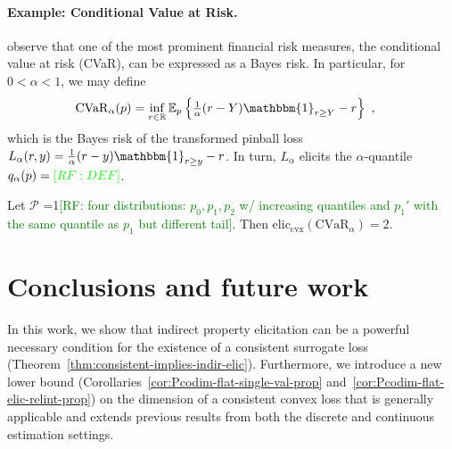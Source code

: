 \documentclass[anon,12pt]{colt2021} %
\newcommand{\Comments}{1}
\newcommand{\mynote}[2]{\ifnum\Comments=1\textcolor{#1}{#2}\fi}
\newcommand{\raf}[1]{\mynote{green}{[RF: #1]}}
\newcommand{\reals}{\mathbb{R}}
\newcommand{\eliccvx}{\mathrm{elic}_\mathrm{cvx}}
\newcommand{\E}{\mathbb{E}}
\renewcommand{\P}{\mathcal{P}}
\newcommand{\CVaR}{\mathrm{CVaR}}
\newcommand{\ones}{\mathbbm{1}}
\begin{document}
\paragraph{Example: Conditional Value at Risk.}

\citet{frongillo2018elicitation} observe that one of the most prominent financial risk measures, the conditional value at risk (CVaR), can be expressed as a Bayes risk.
In particular, for $0 < \alpha < 1$, we may define
\begin{align}
  \CVaR_\alpha(p)
  &= \inf_{r\in\reals} \E_p\left\{ \tfrac 1 \alpha(r-Y)\ones_{r\geq Y}- r\right\}~,
  \label{eq:elic-complex-es-3}
\end{align}
which is the Bayes risk of the transformed pinball loss $L_\alpha(r,y) = \tfrac 1 \alpha(r-y)\ones_{r\geq y}-r$.
In turn, $L_\alpha$ elicits the $\alpha$-quantile $q_\alpha(p) = \raf{DEF}$.

\begin{corollary}
  \label{cor:spectral-risks}
  Let $\P$ \raf{four distributions: $p_0,p_1,p_2$ w/ increasing quantiles and $p_1'$ with the same quantile as $p_1$ but different tail}.
  Then $\eliccvx(\CVaR_\alpha) = 2$.
\end{corollary}


\section{Conclusions and future work}\label{sec:conclusions}
In this work, we show that indirect property elicitation can be a powerful necessary condition for the existence of a consistent surrogate loss (Theorem~\ref{thm:consistent-implies-indir-elic}).
Furthermore, we introduce a new lower bound (Corollaries~\ref{cor:Pcodim-flat-single-val-prop} and~\ref{cor:Pcodim-flat-elic-relint-prop}) on the dimension of a consistent convex loss that is generally applicable and extends previous results from both the discrete and continuous estimation settings.
\end{document}
